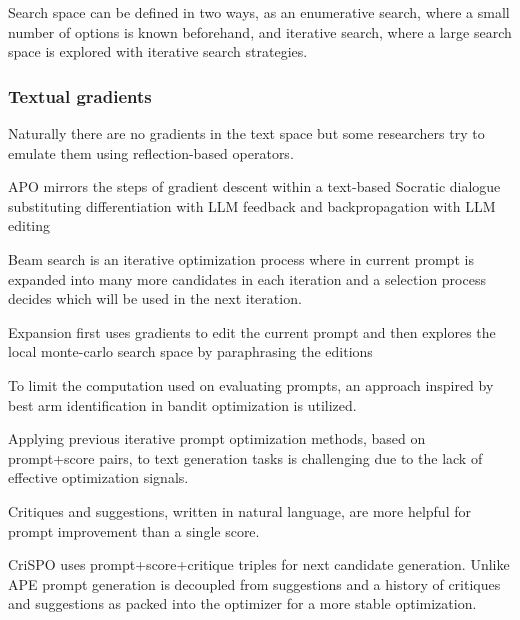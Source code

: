 Search space can be defined in two ways, as an enumerative search, where a small number of options is known beforehand, 
and iterative search, where a large search space is explored with iterative search strategies. \cite{schnabel2024symbolicpromptprogramsearch}



\subsubsection{Textual gradients}
Naturally there are no gradients in the text space but some researchers try to emulate them using reflection-based operators.

APO mirrors the steps of gradient descent within a text-based Socratic dialogue substituting differentiation with LLM feedback and backpropagation with LLM editing \cite{pryzant2023automaticpromptoptimizationgradient}

Beam search is an iterative optimization process where in current prompt is expanded into many more candidates in each iteration and a selection process decides which will be used in the next iteration. \cite{pryzant2023automaticpromptoptimizationgradient}

Expansion first uses gradients to edit the current prompt and then explores the local monte-carlo search space by paraphrasing the editions \cite{pryzant2023automaticpromptoptimizationgradient}

To limit the computation used on evaluating prompts, an approach inspired by best arm identification in bandit optimization is utilized. \cite{pryzant2023automaticpromptoptimizationgradient}


Applying previous iterative prompt optimization methods, based on prompt+score pairs, to text generation tasks is challenging due to the lack of effective optimization signals. \cite{he2024crispomultiaspectcritiquesuggestionguidedautomatic}

Critiques and suggestions, written in natural language, are more helpful for prompt improvement than a single score.\cite{he2024crispomultiaspectcritiquesuggestionguidedautomatic}

CriSPO uses prompt+score+critique triples for next candidate generation. \cite{he2024crispomultiaspectcritiquesuggestionguidedautomatic}
Unlike APE \cite{pryzant2023automaticpromptoptimizationgradient} prompt generation is decoupled from suggestions and a history of critiques and suggestions as packed into the optimizer for a more stable optimization. \cite{he2024crispomultiaspectcritiquesuggestionguidedautomatic}

